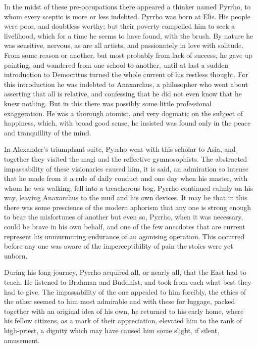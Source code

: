 \documentclass[]{book}
\begin{document}
In the midst of these pre-occupations there appeared a thinker named
Pyrrho, to whom every sceptic is more or less indebted. Pyrrho was born
at Elis. His people were poor, and doubtless worthy; but their poverty
compelled him to seek a livelihood, which for a time he seems to have
found, with the brush. By nature he was sensitive, nervous, as are all
artists, and passionately in love with solitude. From some reason or
another, but most probably from lack of success, he gave up painting,
and wandered from one school to another, until at last a sudden
introduction to Democritus turned the whole current of his restless
thought. For this introduction he was indebted to Anaxarchus, a
philosopher who went about asserting that all is relative, and
confessing that he did not even know that he knew nothing. But in this
there was possibly some little professional exaggeration. He was a
thorough atomist, and very dogmatic on the subject of happiness, which,
with broad good sense, he insisted was found only in the peace and
tranquillity of the mind.

In Alexander's triumphant suite, Pyrrho went with this scholar to Asia,
and together they visited the magi and the reflective gymnosophists. The
abstracted impassability of these visionaries caused him, it is said, an
admiration so intense that he made from it a rule of daily conduct and
one day when his master, with whom he was walking, fell into a
treacherous bog, Pyrrho continued calmly on his way, leaving Anaxarchus
to the mud and his own devices. It may be that in this there was some
prescience of the modern aphorism that any one is strong enough to bear
the misfortunes of another but even so, Pyrrho, when it was necessary,
could be brave in his own behalf, and one of the few anecdotes that are
current represent his unmurmuring endurance of an agonising operation.
This occurred before any one was aware of the imperceptibility of pain
the stoics were yet unborn.

During his long journey, Pyrrho acquired all, or nearly all, that the
East had to teach. He listened to Brahman and Buddhist, and took from
each what best they had to give. The impassability of the one appealed
to him forcibly, the ethics of the other seemed to him most admirable
and with these for luggage, packed together with an original idea of his
own, he returned to his early home, where his fellow citizens, as a mark
of their appreciation, elevated him to the rank of high-priest, a
dignity which may have caused him some slight, if silent, amusement.
\end{document}
